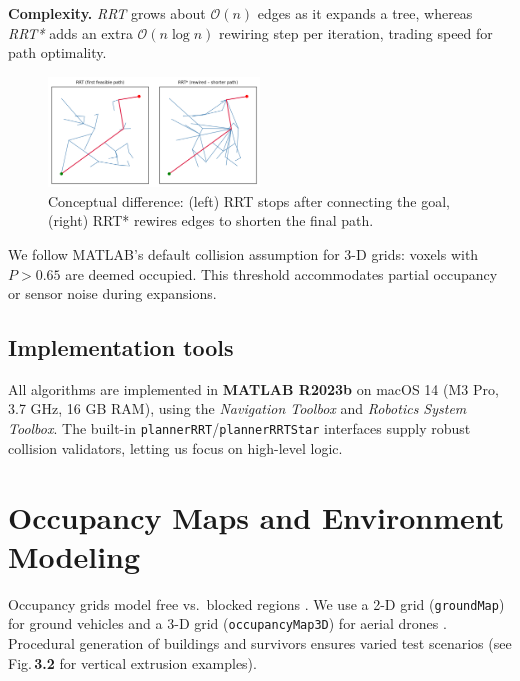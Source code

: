 \documentclass[12pt,a4paper]{report}
\begin{document}
\noindent
\textbf{Complexity.} 
\emph{RRT} grows about $\mathcal{O}(n)$ edges as it expands a tree, whereas \emph{RRT*} 
adds an extra $\mathcal{O}(n \log n)$ rewiring step per iteration, trading speed for 
path optimality.

\begin{figure}[h]
\centering
\includegraphics[width=0.5\textwidth]{figures/RRT_vs_RRTStar_schematic.png}
\caption{Conceptual difference: (left) RRT stops after connecting the goal, 
(right) RRT* rewires edges to shorten the final path.}
\label{fig:rrtSchematic}
\end{figure}

\noindent
We follow MATLAB’s default collision assumption for 3-D grids: 
voxels with $P>0.65$ are deemed occupied.  %
This threshold accommodates partial occupancy or sensor noise during expansions.

\subsection{Implementation tools}   %
\label{subsec:implementationTools}

All algorithms are implemented in \textbf{MATLAB R2023b} on macOS 14
(M3 Pro, 3.7 GHz, 16 GB RAM), using the \emph{Navigation Toolbox} and 
\emph{Robotics System Toolbox}.  The built-in
\texttt{plannerRRT}/\texttt{plannerRRTStar} interfaces supply robust collision
validators, letting us focus on high-level logic.

\section{Occupancy Maps and Environment Modeling}
\label{sec:occ_maps_env_modeling}
Occupancy grids model free vs.\ blocked regions \cite{Elfes1989OccupancyGrid,Raja2024OGMCBF}. 
We use a 2-D grid (\texttt{groundMap}) for ground vehicles and a 3-D grid 
(\texttt{occupancyMap3D}) for aerial drones \cite{Merei2025UAVObstacleSurvey}. 
Procedural generation of buildings and survivors ensures varied test scenarios 
(see Fig.\,\textbf{3.2} for vertical extrusion examples).
\end{document}
